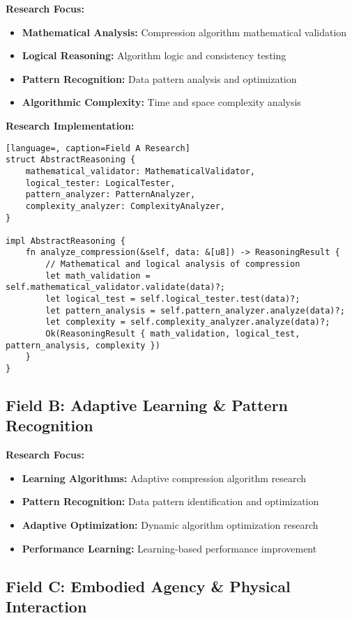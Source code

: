 \documentclass[12pt,a4paper]{article}
\begin{document}
\textbf{Research Focus:}
\begin{itemize}
    \item \textbf{Mathematical Analysis:} Compression algorithm mathematical validation
    \item \textbf{Logical Reasoning:} Algorithm logic and consistency testing
    \item \textbf{Pattern Recognition:} Data pattern analysis and optimization
    \item \textbf{Algorithmic Complexity:} Time and space complexity analysis
\end{itemize}

\textbf{Research Implementation:}
\begin{lstlisting}[language=, caption=Field A Research]
struct AbstractReasoning {
    mathematical_validator: MathematicalValidator,
    logical_tester: LogicalTester,
    pattern_analyzer: PatternAnalyzer,
    complexity_analyzer: ComplexityAnalyzer,
}

impl AbstractReasoning {
    fn analyze_compression(&self, data: &[u8]) -> ReasoningResult {
        // Mathematical and logical analysis of compression
        let math_validation = self.mathematical_validator.validate(data)?;
        let logical_test = self.logical_tester.test(data)?;
        let pattern_analysis = self.pattern_analyzer.analyze(data)?;
        let complexity = self.complexity_analyzer.analyze(data)?;
        Ok(ReasoningResult { math_validation, logical_test, pattern_analysis, complexity })
    }
}
\end{lstlisting}

\subsection{Field B: Adaptive Learning \& Pattern Recognition}

\textbf{Research Focus:}
\begin{itemize}
    \item \textbf{Learning Algorithms:} Adaptive compression algorithm research
    \item \textbf{Pattern Recognition:} Data pattern identification and optimization
    \item \textbf{Adaptive Optimization:} Dynamic algorithm optimization research
    \item \textbf{Performance Learning:} Learning-based performance improvement
\end{itemize}

\subsection{Field C: Embodied Agency \& Physical Interaction}
\end{document}
